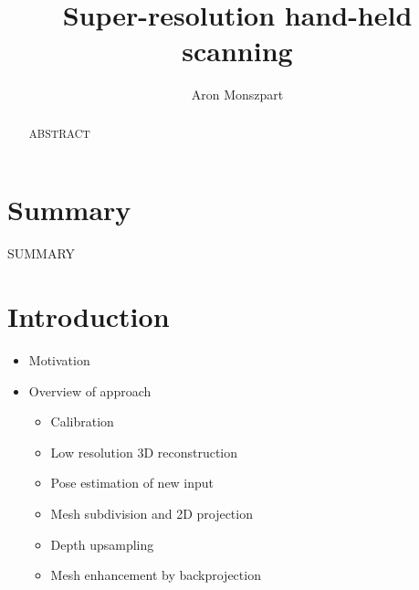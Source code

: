 \documentclass[12pt,a4paper]{article}
\author{Aron Monszpart}
\title{Super-resolution hand-held scanning}
\begin{document}
\maketitle

\begin{abstract}
	ABSTRACT
\end{abstract}

\section{Summary}
	SUMMARY

\tableofcontents

\section{Introduction}
	\begin{itemize}	
		\item Motivation
		\item Overview of approach
		\begin{itemize}
			\item Calibration
			\item Low resolution 3D reconstruction
			\item Pose estimation of new input
			\item Mesh subdivision and 2D projection
			\item Depth upsampling
			\item Mesh enhancement by backprojection
		\end{itemize}
	\end{itemize}
\end{document}
